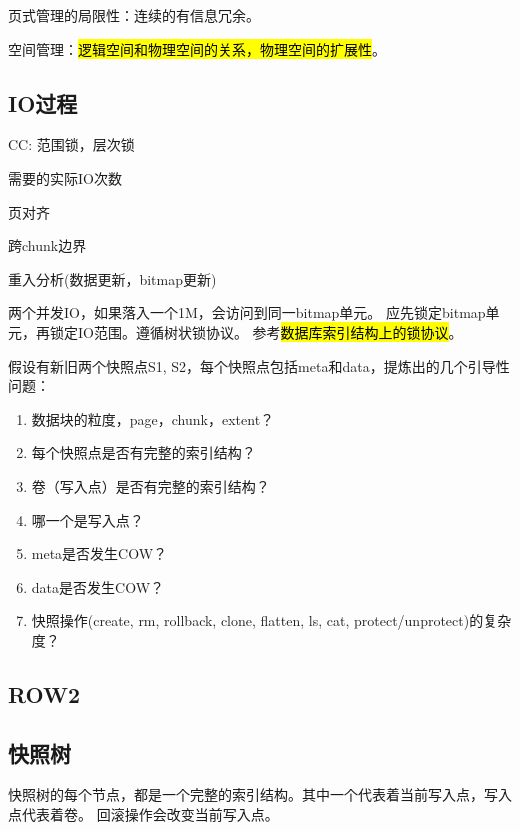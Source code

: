 页式管理的局限性：连续的有信息冗余。

空间管理：\hl{逻辑空间和物理空间的关系，物理空间的扩展性}。

\subsection{IO过程}

\begin{itembox}
\item CC: 范围锁，层次锁
\item 需要的实际IO次数
\item 页对齐
\item 跨chunk边界
\item 重入分析(数据更新，bitmap更新)
\end{itembox}

两个并发IO，如果落入一个1M，会访问到同一bitmap单元。
应先锁定bitmap单元，再锁定IO范围。遵循树状锁协议。
参考\hl{数据库索引结构上的锁协议}。

\begin{tcolorbox}

假设有新旧两个快照点S1, S2，每个快照点包括meta和data，提炼出的几个引导性问题：

\begin{enumerate}
    \item 数据块的粒度，page，chunk，extent？
    \item 每个快照点是否有完整的索引结构？
    \item 卷（写入点）是否有完整的索引结构？
    \item 哪一个是写入点？
    \item meta是否发生COW？
    \item data是否发生COW？
    \item 快照操作(create, rm, rollback, clone, flatten, ls, cat, protect/unprotect)的复杂度？
\end{enumerate}

\end{tcolorbox}

\subsection{ROW2}

\subsection{快照树}

快照树的每个节点，都是一个完整的索引结构。其中一个代表着当前写入点，写入点代表着卷。
回滚操作会改变当前写入点。

